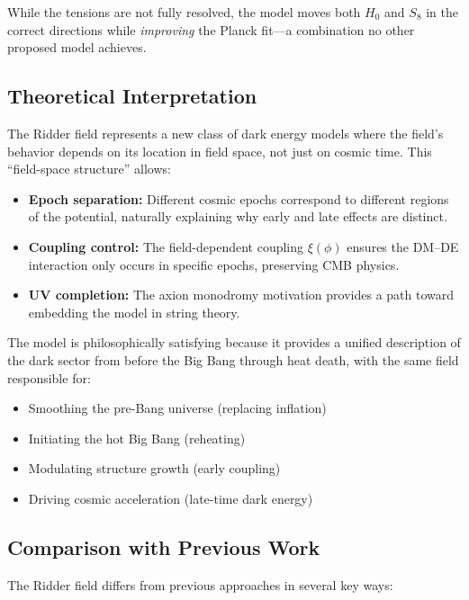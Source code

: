 \documentclass[twocolumn,showpacs,preprintnumbers,amsmath,amssymb,prd]{revtex4-2}
\begin{document}
While the tensions are not fully resolved, the model moves both $H_0$ and $S_8$ in the correct directions while \textit{improving} the Planck fit---a combination no other proposed model achieves.

\subsection{Theoretical Interpretation}

The Ridder field represents a new class of dark energy models where the field's behavior depends on its location in field space, not just on cosmic time. This ``field-space structure'' allows:

\begin{itemize}
    \item \textbf{Epoch separation:} Different cosmic epochs correspond to different regions of the potential, naturally explaining why early and late effects are distinct.
    
    \item \textbf{Coupling control:} The field-dependent coupling $\xi(\phi)$ ensures the DM--DE interaction only occurs in specific epochs, preserving CMB physics.
    
    \item \textbf{UV completion:} The axion monodromy motivation provides a path toward embedding the model in string theory.
\end{itemize}

The model is philosophically satisfying because it provides a unified description of the dark sector from before the Big Bang through heat death, with the same field responsible for:
\begin{itemize}
    \item Smoothing the pre-Bang universe (replacing inflation)
    \item Initiating the hot Big Bang (reheating)
    \item Modulating structure growth (early coupling)
    \item Driving cosmic acceleration (late-time dark energy)
\end{itemize}

\subsection{Comparison with Previous Work}

The Ridder field differs from previous approaches in several key ways:
\end{document}
